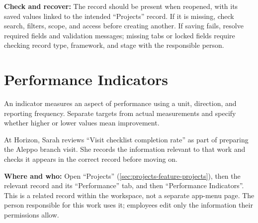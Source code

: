 \textbf{Check and recover:} The record should be present when reopened, with its saved values linked to the intended “Projects” record. If it is missing, check search, filters, scope, and access before creating another. If saving fails, resolve required fields and validation messages; missing tabs or locked fields require checking record type, framework, and stage with the responsible person.

\clearpage
\section{Performance Indicators}
\label{sec:projects-feature-performance-indicators}

An indicator measures an aspect of performance using a unit, direction, and reporting frequency. Separate targets from actual measurements and specify whether higher or lower values mean improvement.

\begin{rcnote}
At Horizon, Sarah reviews “Visit checklist completion rate” as part of preparing the Aleppo branch visit. She records the information relevant to that work and checks it appears in the correct record before moving on.
\end{rcnote}

\textbf{Where and who:} Open “Projects” (\ref{sec:projects-feature-projects}), then the relevant record and its “Performance” tab, and then “Performance Indicators”. This is a related record within the workspace, not a separate app-menu page. The person responsible for this work uses it; employees edit only the information their permissions allow.

